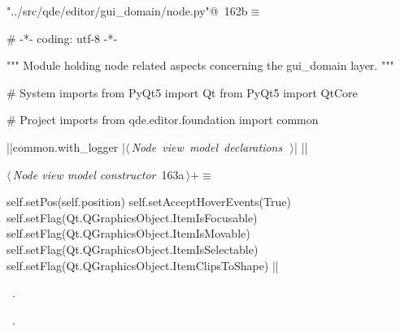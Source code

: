 \documentclass[%
    a4paper,    %
    justified,  %
    nobib,      %
    openany     %
]{tufte-book}
\begin{document}
\begin{flushleft} \small
\begin{minipage}{\linewidth}\label{scrap188}\raggedright\small
{} \verb@"../src/qde/editor/gui_domain/node.py"@\nobreak\ {\footnotesize {162b}}$\equiv$
\vspace{-1ex}
\begin{pythoncode}
# -*- coding: utf-8 -*-

""" Module holding node related aspects concerning the gui_domain layer. """

# System imports
from PyQt5 import Qt
from PyQt5 import QtCore

# Project imports
from qde.editor.foundation import common

|\normalfont{}\fontfamily{}|common.with_logger
|\hbox{$\langle\,${\itshape Node view model declarations}\nobreak\ {\footnotesize {}}$\,\rangle$}|
|\NWsep|
\end{pythoncode}
\vspace{1.5ex}
\footnotesize
\begin{list}{}{\setlength{\itemsep}{-\parsep}\setlength{\itemindent}{-\leftmargin}}

\item{}
\end{list}
\end{minipage}\vspace{4ex}
\end{flushleft}
\begin{flushleft} \small
\begin{minipage}{\linewidth}\label{scrap189}\raggedright\small
{} $\langle\,${\itshape Node view model constructor}\nobreak\ {\footnotesize {163a}}$\,\rangle+\equiv$
\vspace{-1ex}
\begin{pythoncode}
    self.setPos(self.position)
    self.setAcceptHoverEvents(True)
    self.setFlag(Qt.QGraphicsObject.ItemIsFocusable)
    self.setFlag(Qt.QGraphicsObject.ItemIsMovable)
    self.setFlag(Qt.QGraphicsObject.ItemIsSelectable)
    self.setFlag(Qt.QGraphicsObject.ItemClipsToShape)
|\NWsep|
\end{pythoncode}
\vspace{1.5ex}
\footnotesize
\begin{list}{}{\setlength{\itemsep}{-\parsep}\setlength{\itemindent}{-\leftmargin}}
\item \NWtxtMacroDefBy\ .
\item \NWtxtMacroRefIn\ .

\item{}
\end{list}
\end{minipage}\vspace{4ex}
\end{flushleft}
\end{document}
